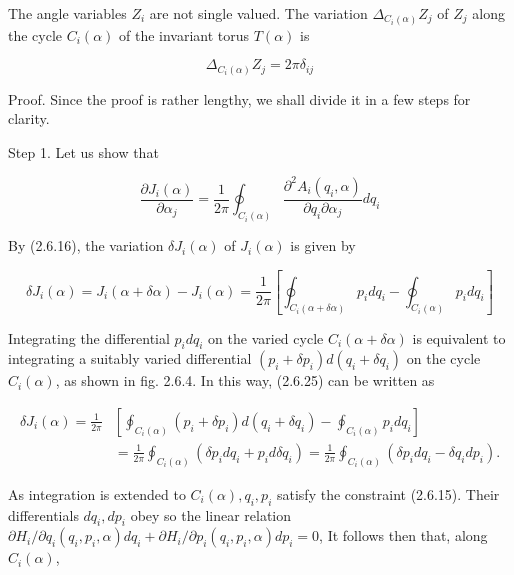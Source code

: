 \documentclass{article}
\begin{document}
The angle variables $Z_{i}$ are not single valued. The variation $\Delta_{C_{i}(\alpha)} Z_{j}$ of $Z_{j}$ along the cycle $C_{i}(\alpha)$ of the invariant torus $T(\alpha)$ is
 
\begin{equation*}
\Delta_{C_{i}(\alpha)} Z_{j}=2 \pi \delta_{i j} \tag{2.6.23}
\end{equation*}
 

Proof. Since the proof is rather lengthy, we shall divide it in a few steps for clarity.

Step 1. Let us show that
 
\begin{equation*}
\frac{\partial J_{i}(\alpha)}{\partial \alpha_{j}}=\frac{1}{2 \pi} \oint_{C_{i}(\alpha)} \frac{\partial^{2} A_{i}\left(q_{i}, \alpha\right)}{\partial q_{i} \partial \alpha_{j}} d q_{i} \tag{2.6.24}
\end{equation*}
 

By (2.6.16), the variation $\delta J_{i}(\alpha)$ of $J_{i}(\alpha)$ is given by
 
\begin{equation*}
\delta J_{i}(\alpha)=J_{i}(\alpha+\delta \alpha)-J_{i}(\alpha)=\frac{1}{2 \pi}\left[\oint_{C_{i}(\alpha+\delta \alpha)} p_{i} d q_{i}-\oint_{C_{i}(\alpha)} p_{i} d q_{i}\right] \tag{2.6.25}
\end{equation*}
 

Integrating the differential $p_{i} d q_{i}$ on the varied cycle $C_{i}(\alpha+\delta \alpha)$ is equivalent to integrating a suitably varied differential $\left(p_{i}+\delta p_{i}\right) d\left(q_{i}+\delta q_{i}\right)$ on the cycle $C_{i}(\alpha)$, as shown in fig. 2.6.4. In this way, (2.6.25) can be written as
 
\begin{align*}
\delta J_{i}(\alpha)=\frac{1}{2 \pi} & {\left[\oint_{C_{i}(\alpha)}\left(p_{i}+\delta p_{i}\right) d\left(q_{i}+\delta q_{i}\right)-\oint_{C_{i}(\alpha)} p_{i} d q_{i}\right] }  \tag{2.6.26}\\
& =\frac{1}{2 \pi} \oint_{C_{i}(\alpha)}\left(\delta p_{i} d q_{i}+p_{i} d \delta q_{i}\right)=\frac{1}{2 \pi} \oint_{C_{i}(\alpha)}\left(\delta p_{i} d q_{i}-\delta q_{i} d p_{i}\right) .
\end{align*}
 

As integration is extended to $C_{i}(\alpha), q_{i}, p_{i}$ satisfy the constraint (2.6.15). Their differentials $d q_{i}, d p_{i}$ obey so the linear relation $\partial H_{i} / \partial q_{i}\left(q_{i}, p_{i}, \alpha\right) d q_{i}+\partial H_{i} / \partial p_{i}\left(q_{i}, p_{i}, \alpha\right) d p_{i}=0$, It follows then that, along $C_{i}(\alpha)$,
 
\end{document}
